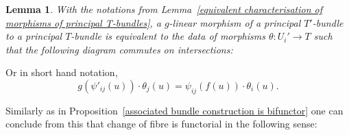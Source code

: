 \documentclass[10pt,oneside]{amsart}
\newtheorem{lemma}[theorem]{Lemma}
\theoremstyle{definition}
\begin{document}
	\begin{lemma}
		With the notations from Lemma~\ref{equivalent characterisation of morphisms of principal T-bundles}, a $g$-linear morphism of a principal $T'$-bundle to a principal $T$-bundle is equivalent to the data of morphisms $\theta: U_i'\rightarrow T$ such that the following diagram commutes on intersections:
		\begin{center}
		\end{center}
	\end{lemma}
	Or in short hand notation,
	\begin{equation}\label{shorthand for description of semi-linear morphism of fibre  bundles}
	g(\psi'_{ij}(u))\cdot\theta_j(u)=\psi_{ij}(f(u))\cdot \theta_i(u).
	\end{equation}
	
	
	Similarly as in Proposition~\ref{associated bundle construction is bifunctor} one can conclude from this that change of fibre is functorial in the following sense:
	
\end{document}
